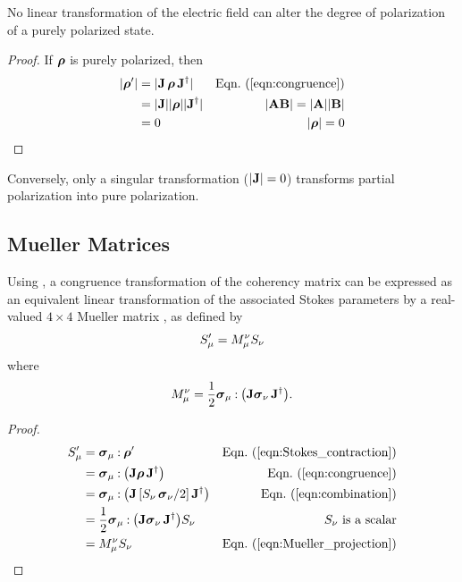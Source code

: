 No linear transformation of the electric field can alter the degree of polarization of a purely polarized state.  
%
\begin{proof}
\label{proof:no_depolarization}
If $\mbox{\boldmath $\rho$}$ is purely polarized, then
%
\begin{align*}
| \cohM{\rho}' |
&= | \JM{J} \, \cohM{\rho} \, \JM{J}^\dagger |
	& \peqn{congruence} \\
&= | \JM{J} | |\cohM{\rho}| | \JM{J}^\dagger |
	& |\JM{A}\JM{B}| = |\JM{A}||\JM{B}| \\
&= 0
	& |{\cohM{\rho}}| = 0
\end{align*}
\end{proof}
%
\noindent
Conversely, only a singular transformation ($|{\bf J}| = 0$) transforms partial polarization into pure polarization.
%


\subsection{Mueller Matrices}
\label{sec:Mueller}

Using , a congruence
transformation of the coherency matrix can be expressed as an
equivalent linear transformation of the associated Stokes parameters
by a real-valued $4\times4$ Mueller matrix , as defined by
%
\begin{equation}
 S_\mu' = M_\mu^\nu S_\nu
\label{eqn:linear_to_Mueller}
\end{equation}
%
where
%
\begin{equation}
  M_\mu^\nu = \frac{1}{2} {\mbox{\boldmath $\sigma$}_{\mu}}\mathbin{:}{\left({\bf J}\mbox{\boldmath $\sigma$}_{\nu}\,{\bf J}^\dagger\right)}.
\label{eqn:Mueller_projection}
\end{equation}

\begin{proof}

\begin{align*}
S_\irow' 
&= \dc{\pauli{\irow}}{\cohM{\rho}'} & \peqn{Stokes_contraction} \\
&= \dc{\pauli{\irow}}{\left(\JM{J}\cohM{\rho}\, \JM{J}^\dagger\right)}   & \peqn{congruence} \\
&= \dc{\pauli{\irow}}{\left(\JM{J}\left[S_\icol\,\pauli{\icol}/2\right]\JM{J}^\dagger\right)} & \peqn{combination} \\
&= \frac{1}{2}\dc{\pauli{\irow}}{\left(\JM{J}\pauli{\icol}\, \JM{J}^\dagger\right)}S_\icol & \text{$S_\nu$ is a scalar} \\
&= M_\irow^\icol S_\icol & \peqn{Mueller_projection}
\end{align*}
\end{proof}

